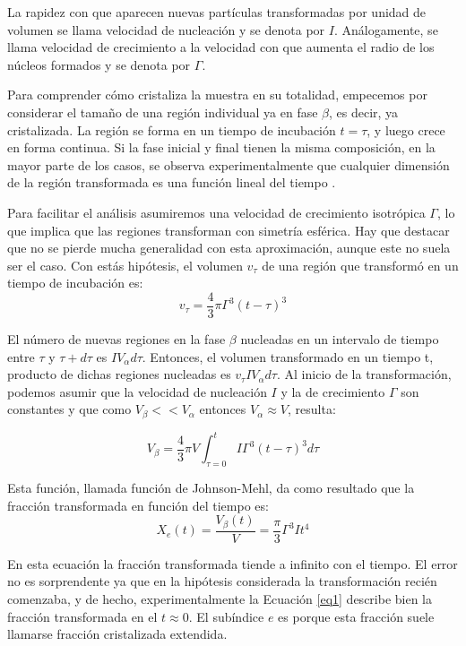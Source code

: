 \documentclass[12pt]{article}
\theoremstyle{definition}
\theoremstyle{remark}
\begin{document}
La rapidez con que aparecen nuevas partículas transformadas por unidad de volumen se llama velocidad de nucleación y se denota por $I$. Análogamente, se llama velocidad de crecimiento a la velocidad con que aumenta el radio de los núcleos formados y se denota por $\Gamma$.

Para comprender cómo cristaliza la muestra en su totalidad, empecemos por
considerar el tamaño de una región individual ya en fase $\beta$, es decir, ya cristalizada. La región se forma en un tiempo de incubación $t=\tau$, y luego crece en forma continua. Si la fase inicial y final tienen la misma composición, en la mayor parte de los casos, se observa experimentalmente que cualquier dimensión de la región transformada es una función lineal del tiempo \citep{Transformations2002}.

Para facilitar el análisis asumiremos una velocidad de crecimiento isotrópica $\Gamma$, lo que implica que las regiones transforman con simetría esférica. Hay que destacar que no se pierde mucha generalidad con esta aproximación, aunque este no suela ser el caso. Con estás hipótesis, el volumen $v_\tau$ de una región que transformó en un tiempo de incubación es:
\begin{equation}
	v_\tau = \frac{4}{3}\pi \Gamma^3(t-\tau)^3
\end{equation}

El número de nuevas regiones en la fase $\beta$ nucleadas en un intervalo de tiempo entre $\tau$ y $\tau + d\tau$ es $IV_\alpha d\tau$. Entonces, el volumen transformado en un tiempo t, producto de dichas regiones nucleadas es $v_\tau IV_\alpha d\tau$. Al inicio de la transformación, podemos asumir que la velocidad de nucleación $I$ y la de crecimiento $\Gamma$ son constantes y que como $V_\beta << V_\alpha$ entonces $V_\alpha \approx V$, resulta:

\begin{equation}
\label{integral}
	V_\beta = \frac{4}{3}\pi V \int_{\tau = 0}^{t} I\Gamma^3(t-\tau)^3d\tau
\end{equation}

Esta función, llamada función de Johnson-Mehl, da como resultado que la fracción transformada en función del tiempo es:
\begin{equation}
\label{eq1}
	X_e(t) = \frac{V_\beta (t)}{V} = \frac{\pi}{3}\Gamma^3 I t^4
\end{equation}

En esta ecuación la fracción transformada tiende a infinito con el tiempo. El error no es sorprendente ya que en la hipótesis considerada la transformación recién comenzaba, y de hecho, experimentalmente la Ecuación \ref{eq1} describe bien la fracción transformada en el $t \approx 0$. El subíndice $e$ es porque esta fracción suele llamarse fracción cristalizada extendida.
\end{document}

